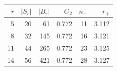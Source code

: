 \begin{tabular}{rrrrrr}
\toprule
$r$ & $|S_r|$ & $|B_r|$ & $G_2$ & $n_+$ & $r_+$ \\
\midrule
5 & 20 & 61 & 0.772 & 11 & 3.112 \\
8 & 32 & 145 & 0.772 & 16 & 3.121 \\
11 & 44 & 265 & 0.772 & 23 & 3.125 \\
14 & 56 & 421 & 0.772 & 28 & 3.127 \\
\bottomrule
\end{tabular}

